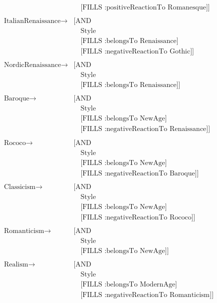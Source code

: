 \begin{align*}
      &\quad\text{[FILLS :positiveReactionTo Romanesque]]}\\\\
      \text{ItalianRenaissance} \to& \text{[AND}\\
      &\quad\text{Style}\\
      &\quad\text{[FILLS :belongsTo Renaissance]}\\
      &\quad\text{[FILLS :negativeReactionTo Gothic]]}\\\\
      \text{NordicRenaissance} \to& \text{[AND}\\
      &\quad\text{Style}\\
      &\quad\text{[FILLS :belongsTo Renaissance]]}\\\\
      \text{Baroque} \to& \text{[AND}\\
      &\quad\text{Style}\\
      &\quad\text{[FILLS :belongsTo NewAge]}\\
      &\quad\text{[FILLS :negativeReactionTo Renaissance]]}\\\\
      \text{Rococo} \to& \text{[AND}\\
      &\quad\text{Style}\\
      &\quad\text{[FILLS :belongsTo NewAge]}\\
      &\quad\text{[FILLS :negativeReactionTo Baroque]]}\\\\
      \text{Classicism} \to& \text{[AND}\\
      &\quad\text{Style}\\
      &\quad\text{[FILLS :belongsTo NewAge]}\\
      &\quad\text{[FILLS :negativeReactionTo Rococo]]}\\\\
      \text{Romanticism} \to& \text{[AND}\\
      &\quad\text{Style}\\
      &\quad\text{[FILLS :belongsTo NewAge]]}\\\\
      \text{Realism} \to& \text{[AND}\\
      &\quad\text{Style}\\
      &\quad\text{[FILLS :belongsTo ModernAge]}\\
      &\quad\text{[FILLS :negativeReactionTo Romanticism]]}\\\\

\end{align*}
